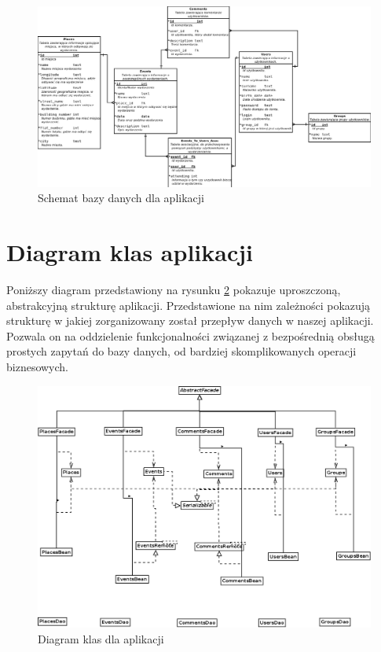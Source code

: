 \documentclass[a4paper]{article}
\begin{document}
\begin{figure}[!h]
\begin{center}
  \includegraphics[width=\textwidth]{baza.png}
  \caption{Schemat bazy danych dla aplikacji}
  \label{baza}
\end{center}
\end{figure}

\pagebreak
\section{Diagram klas aplikacji}
Poniższy diagram przedstawiony na rysunku \ref{klasy} pokazuje uproszczoną, abstrakcyjną strukturę aplikacji.
Przedstawione na nim zależności pokazują strukturę w jakiej zorganizowany został przepływ danych w naszej aplikacji.
Pozwala on na oddzielenie funkcjonalności związanej z bezpośrednią obsługą prostych zapytań do bazy danych, od bardziej skomplikowanych
operacji biznesowych.


\begin{figure}[!h]
\begin{center}
  \includegraphics[width=\textwidth]{classDiagram.png}
  \caption{Diagram klas dla aplikacji}
  \label{klasy}
\end{center}
\end{figure}
\end{document}
